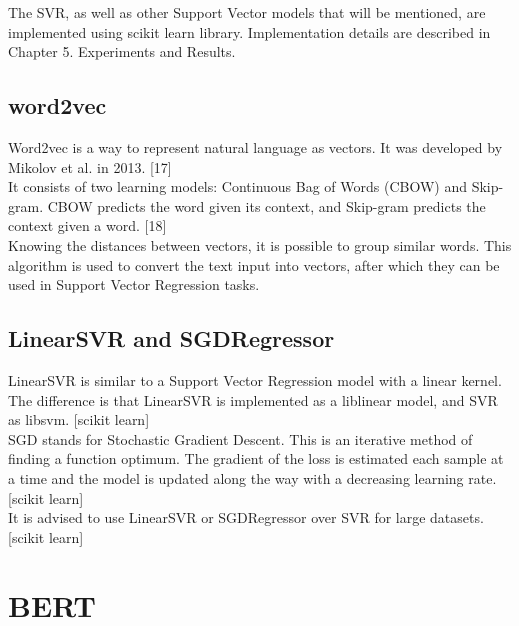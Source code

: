 \documentclass[times, utf8, zavrsni, english]{fer}
\begin{document}
The SVR, as well as other Support Vector models that will be mentioned, are implemented using scikit learn library. Implementation details are described in Chapter 5. Experiments and Results.

\subsection{word2vec}
Word2vec is a way to represent natural language as vectors. It was developed by Mikolov et al. in 2013. [17] \\
It consists of two learning models: Continuous Bag of Words (CBOW) and Skip-gram. CBOW predicts the word given its context, and Skip-gram predicts the context given a word. [18] \\
Knowing the distances between vectors, it is possible to group similar words.
This algorithm is used to convert the text input into vectors, after which they can be used in Support Vector Regression tasks.
\subsection{LinearSVR and SGDRegressor}
LinearSVR is similar to a Support Vector Regression model with a linear kernel. 
The difference is that LinearSVR is implemented as a liblinear model, and SVR as libsvm. [scikit learn] \\
SGD stands for Stochastic Gradient Descent. This is an iterative method of finding a function optimum. The gradient of the loss is estimated each sample at a time and the model is updated along the way with a decreasing learning rate. [scikit learn] \\
It is advised to use LinearSVR or SGDRegressor over SVR for large datasets. [scikit learn] 

\section{BERT}
\end{document}
